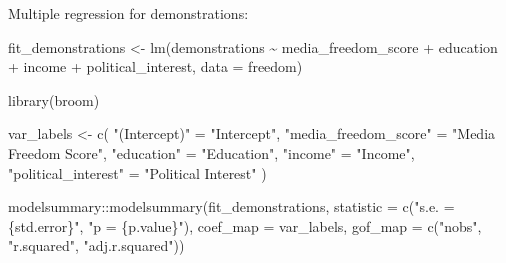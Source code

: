 \documentclass[
]{article}
\newenvironment{Shaded}{\begin{snugshade}}{\end{snugshade}}
\newcommand{\AttributeTok}[1]{\textcolor[rgb]{0.77,0.63,0.00}{#1}}
\newcommand{\FunctionTok}[1]{\textcolor[rgb]{0.00,0.00,0.00}{#1}}
\newcommand{\NormalTok}[1]{#1}
\newcommand{\OtherTok}[1]{\textcolor[rgb]{0.56,0.35,0.01}{#1}}
\newcommand{\SpecialCharTok}[1]{\textcolor[rgb]{0.00,0.00,0.00}{#1}}
\newcommand{\StringTok}[1]{\textcolor[rgb]{0.31,0.60,0.02}{#1}}
\begin{document}
Multiple regression for demonstrations:

\begin{Shaded}
\begin{Highlighting}[]
\NormalTok{fit\_demonstrations }\OtherTok{\textless{}{-}} \FunctionTok{lm}\NormalTok{(demonstrations }\SpecialCharTok{\textasciitilde{}}\NormalTok{ media\_freedom\_score }\SpecialCharTok{+}\NormalTok{ education }\SpecialCharTok{+}\NormalTok{ income }\SpecialCharTok{+}\NormalTok{ political\_interest, }\AttributeTok{data =}\NormalTok{ freedom)}

\FunctionTok{library}\NormalTok{(broom)}

\NormalTok{var\_labels }\OtherTok{\textless{}{-}} \FunctionTok{c}\NormalTok{(}
    \StringTok{"(Intercept)"} \OtherTok{=} \StringTok{"Intercept"}\NormalTok{,}
    \StringTok{"media\_freedom\_score"} \OtherTok{=} \StringTok{"Media Freedom Score"}\NormalTok{,}
    \StringTok{"education"} \OtherTok{=} \StringTok{"Education"}\NormalTok{,}
    \StringTok{"income"} \OtherTok{=} \StringTok{"Income"}\NormalTok{,}
    \StringTok{"political\_interest"} \OtherTok{=} \StringTok{"Political Interest"}
\NormalTok{)}

\NormalTok{modelsummary}\SpecialCharTok{::}\FunctionTok{modelsummary}\NormalTok{(fit\_demonstrations,}
                             \AttributeTok{statistic =} \FunctionTok{c}\NormalTok{(}\StringTok{"s.e. = \{std.error\}"}\NormalTok{,}
               \StringTok{"p = \{p.value\}"}\NormalTok{),}
\AttributeTok{coef\_map =}\NormalTok{ var\_labels,}
\AttributeTok{gof\_map =} \FunctionTok{c}\NormalTok{(}\StringTok{"nobs"}\NormalTok{, }\StringTok{"r.squared"}\NormalTok{, }\StringTok{"adj.r.squared"}\NormalTok{))}
\end{Highlighting}
\end{Shaded}
\end{document}
